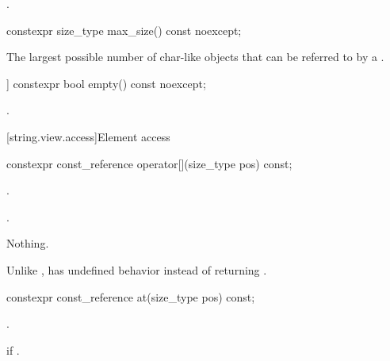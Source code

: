 \begin{itemdescr}
\pnum
\returns
{}.
\end{itemdescr}


%
\begin{itemdecl}
constexpr size_type max_size() const noexcept;
\end{itemdecl}

\begin{itemdescr}
\pnum
\returns
The largest possible number of char-like objects that can be referred to by a .
\end{itemdescr}

%
\begin{itemdecl}
[[nodiscard]] constexpr bool empty() const noexcept;
\end{itemdecl}

\begin{itemdescr}
\pnum
\returns
{}.
\end{itemdescr}

[string.view.access]{Element access}

%
\begin{itemdecl}
constexpr const_reference operator[](size_type pos) const;
\end{itemdecl}

\begin{itemdescr}
\pnum
\expects
{}.

\pnum
\returns
{}.

\pnum
\throws
Nothing.

\pnum
\begin{note}
Unlike ,
 has undefined behavior instead of returning .
\end{note}
\end{itemdescr}

%
\begin{itemdecl}
constexpr const_reference at(size_type pos) const;
\end{itemdecl}

\begin{itemdescr}
\pnum
\returns
{}.

\pnum
\throws
{} if .
\end{itemdescr}

